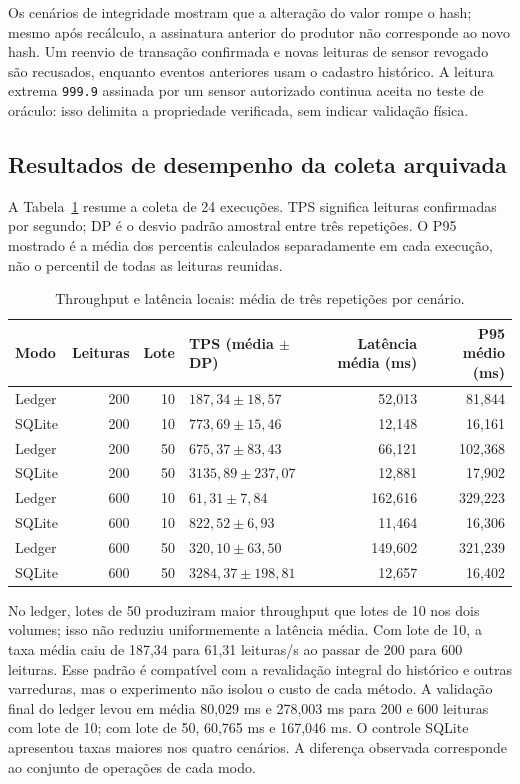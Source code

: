 \documentclass[10pt,a4paper,twocolumn]{article}
\begin{document}
Os cenários de integridade mostram que a alteração do valor rompe o hash; mesmo após recálculo, a assinatura anterior do produtor não corresponde ao novo hash. Um reenvio de transação confirmada e novas leituras de sensor revogado são recusados, enquanto eventos anteriores usam o cadastro histórico. A leitura extrema \texttt{999.9} assinada por um sensor autorizado continua aceita no teste de oráculo: isso delimita a propriedade verificada, sem indicar validação física.

\subsection{Resultados de desempenho da coleta arquivada}
A Tabela~\ref{tab:medicoes} resume a coleta de 24 execuções. TPS significa leituras confirmadas por segundo; DP é o desvio padrão amostral entre três repetições. O P95 mostrado é a média dos percentis calculados separadamente em cada execução, não o percentil de todas as leituras reunidas.

\begin{table}[t]
\centering\scriptsize
\setlength{\tabcolsep}{4pt}
\caption{Throughput e latência locais: média de três repetições por cenário.}
\label{tab:medicoes}
\begin{tabularx}{\textwidth}{l r r X r r}
\toprule
Modo & Leituras & Lote & TPS (média $\pm$ DP) & Latência média (ms) & P95 médio (ms) \\
\midrule
Ledger & 200 & 10 & $187{,}34 \pm 18{,}57$ & 52,013 & 81,844 \\
SQLite & 200 & 10 & $773{,}69 \pm 15{,}46$ & 12,148 & 16,161 \\
Ledger & 200 & 50 & $675{,}37 \pm 83{,}43$ & 66,121 & 102,368 \\
SQLite & 200 & 50 & $3135{,}89 \pm 237{,}07$ & 12,881 & 17,902 \\
Ledger & 600 & 10 & $61{,}31 \pm 7{,}84$ & 162,616 & 329,223 \\
SQLite & 600 & 10 & $822{,}52 \pm 6{,}93$ & 11,464 & 16,306 \\
Ledger & 600 & 50 & $320{,}10 \pm 63{,}50$ & 149,602 & 321,239 \\
SQLite & 600 & 50 & $3284{,}37 \pm 198{,}81$ & 12,657 & 16,402 \\
\bottomrule
\end{tabularx}
\end{table}

No ledger, lotes de 50 produziram maior throughput que lotes de 10 nos dois volumes; isso não reduziu uniformemente a latência média. Com lote de 10, a taxa média caiu de 187,34 para 61,31 leituras/s ao passar de 200 para 600 leituras. Esse padrão é compatível com a revalidação integral do histórico e outras varreduras, mas o experimento não isolou o custo de cada método. A validação final do ledger levou em média 80,029 ms e 278,003 ms para 200 e 600 leituras com lote de 10; com lote de 50, 60,765 ms e 167,046 ms. O controle SQLite apresentou taxas maiores nos quatro cenários. A diferença observada corresponde ao conjunto de operações de cada modo.
\end{document}
